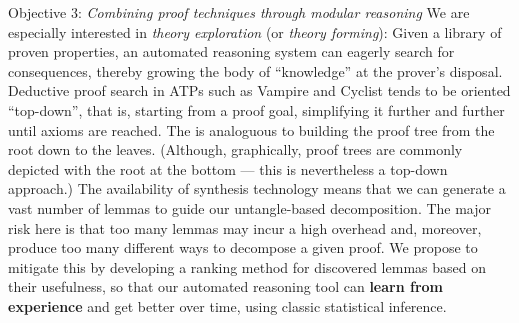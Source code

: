 \begin{paragraph}{Objective 3: {\it Combining proof techniques through modular reasoning}}
We are especially interested in \emph{theory exploration} (or \emph{theory forming}):
Given a library of proven properties, an automated reasoning system can eagerly search for consequences, thereby growing the body of ``knowledge'' at the prover's disposal.
Deductive proof search in ATPs such as Vampire and Cyclist tends to be oriented ``top-down'', that is,
starting from a proof goal, simplifying it further and further until axioms are reached.
The is analoguous to building the proof tree from the root down to the leaves. (Although, graphically, proof trees are commonly depicted with the root at the bottom --- this is nevertheless a top-down approach.)
The availability of synthesis technology \cite{quickspec,thesy} means that we can generate a vast number of lemmas to guide our untangle-based decomposition.
The major risk here is that too many lemmas may incur a high overhead and, moreover, produce too many different ways to decompose a given proof.
We propose to mitigate this by developing a ranking method for discovered lemmas based on their usefulness,
so that our automated reasoning tool can \textbf{learn from experience} and get better over time, using classic statistical inference.
\end{paragraph}

